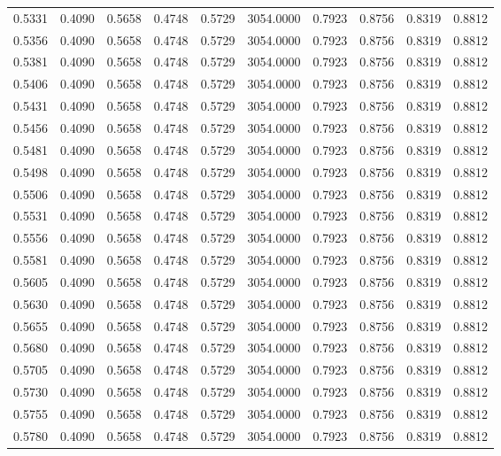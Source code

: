 \begin{tabular}{rrrrrrrrrr}
0.5331 & 0.4090 & 0.5658 & 0.4748 & 0.5729 & 3054.0000 & 0.7923 & 0.8756 & 0.8319 & 0.8812 \\
0.5356 & 0.4090 & 0.5658 & 0.4748 & 0.5729 & 3054.0000 & 0.7923 & 0.8756 & 0.8319 & 0.8812 \\
0.5381 & 0.4090 & 0.5658 & 0.4748 & 0.5729 & 3054.0000 & 0.7923 & 0.8756 & 0.8319 & 0.8812 \\
0.5406 & 0.4090 & 0.5658 & 0.4748 & 0.5729 & 3054.0000 & 0.7923 & 0.8756 & 0.8319 & 0.8812 \\
0.5431 & 0.4090 & 0.5658 & 0.4748 & 0.5729 & 3054.0000 & 0.7923 & 0.8756 & 0.8319 & 0.8812 \\
0.5456 & 0.4090 & 0.5658 & 0.4748 & 0.5729 & 3054.0000 & 0.7923 & 0.8756 & 0.8319 & 0.8812 \\
0.5481 & 0.4090 & 0.5658 & 0.4748 & 0.5729 & 3054.0000 & 0.7923 & 0.8756 & 0.8319 & 0.8812 \\
0.5498 & 0.4090 & 0.5658 & 0.4748 & 0.5729 & 3054.0000 & 0.7923 & 0.8756 & 0.8319 & 0.8812 \\
0.5506 & 0.4090 & 0.5658 & 0.4748 & 0.5729 & 3054.0000 & 0.7923 & 0.8756 & 0.8319 & 0.8812 \\
0.5531 & 0.4090 & 0.5658 & 0.4748 & 0.5729 & 3054.0000 & 0.7923 & 0.8756 & 0.8319 & 0.8812 \\
0.5556 & 0.4090 & 0.5658 & 0.4748 & 0.5729 & 3054.0000 & 0.7923 & 0.8756 & 0.8319 & 0.8812 \\
0.5581 & 0.4090 & 0.5658 & 0.4748 & 0.5729 & 3054.0000 & 0.7923 & 0.8756 & 0.8319 & 0.8812 \\
0.5605 & 0.4090 & 0.5658 & 0.4748 & 0.5729 & 3054.0000 & 0.7923 & 0.8756 & 0.8319 & 0.8812 \\
0.5630 & 0.4090 & 0.5658 & 0.4748 & 0.5729 & 3054.0000 & 0.7923 & 0.8756 & 0.8319 & 0.8812 \\
0.5655 & 0.4090 & 0.5658 & 0.4748 & 0.5729 & 3054.0000 & 0.7923 & 0.8756 & 0.8319 & 0.8812 \\
0.5680 & 0.4090 & 0.5658 & 0.4748 & 0.5729 & 3054.0000 & 0.7923 & 0.8756 & 0.8319 & 0.8812 \\
0.5705 & 0.4090 & 0.5658 & 0.4748 & 0.5729 & 3054.0000 & 0.7923 & 0.8756 & 0.8319 & 0.8812 \\
0.5730 & 0.4090 & 0.5658 & 0.4748 & 0.5729 & 3054.0000 & 0.7923 & 0.8756 & 0.8319 & 0.8812 \\
0.5755 & 0.4090 & 0.5658 & 0.4748 & 0.5729 & 3054.0000 & 0.7923 & 0.8756 & 0.8319 & 0.8812 \\
0.5780 & 0.4090 & 0.5658 & 0.4748 & 0.5729 & 3054.0000 & 0.7923 & 0.8756 & 0.8319 & 0.8812 \\

\end{tabular}

